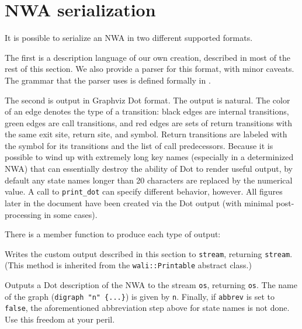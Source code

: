 \section{NWA serialization}
\label{Se:serialization}

\newenvironment{grammar}{\begin{equation*}\begin{array}{lrl}}{\end{array}\end{equation*}}
\newcommand{\nonterm}[1]{\ensuremath{\langle}\textit{#1}\ensuremath{\rangle}}
\newcommand{\term}[1]{\textrm`\texttt{#1}\textrm'}
\newcommand{\cfgsp}{\ \ }


It is possible to serialize an NWA in two different supported
formats.

The first is a description language of our own creation, described in
most of the rest of this section. We also provide a parser for this format,
with minor caveats. The grammar that the parser uses is defined
formally in .

The second is output in Graphviz Dot format. The output is natural. The color
of an edge denotes the type of a transition: black edges are internal
transitions, green edges are call transitions, and red edges are sets of return
transitions with the same exit site, return site, and symbol. Return
transitions are labeled with the symbol for its
transitions and the list of call predecessors.  Because it is possible to wind up with
extremely long key names (especially in a determinized NWA) that can
essentially destroy the ability of Dot to render useful output, by default
any state names longer than 20 characters are replaced by the numerical
value. A call to \texttt{print\_dot} can specify different behavior, however.
All figures later in the document have been created via the Dot output (with
minimal post-processing in some cases).

There is a member function to produce each type of output:
\begin{functionlist}
    Writes the custom output described in this section
    to \texttt{stream}, returning \texttt{stream}.
    (This method is inherited from
    the \texttt{wali::Printable} abstract class.)

  \functionitem[\texttt{std::ostream\& NWA::print\_dot(
      \parbox[t][2\baselineskip][t]{4in}{
                 ostream \& os, std::string const \& n,\\
                 bool abbrev = true)}}]
    Outputs a Dot description of the NWA to the stream \texttt{os}, returning
    \texttt{os}.  The name of the graph (\texttt{digraph "n" \{...\}}) is
    given by \texttt{n}. Finally, if \texttt{abbrev} is set to
    \texttt{false}, the aforementioned abbreviation step above for state
    names is not done. Use this freedom at your peril.
\end{functionlist}


